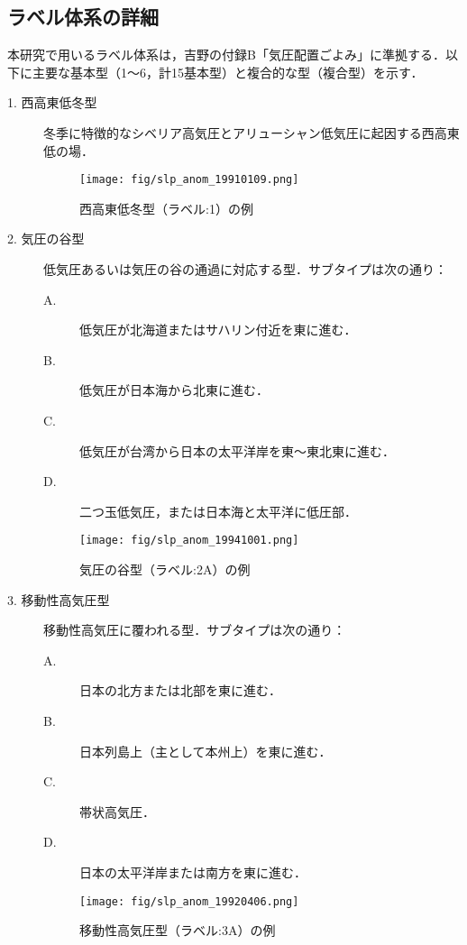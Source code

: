 \documentclass{jarticle}
\theoremstyle{definition}
\begin{document}
\subsection{ラベル体系の詳細}
本研究で用いるラベル体系は，吉野\cite{吉野2002日本の気候}の付録B「気圧配置ごよみ」に準拠する．以下に主要な基本型（1〜6，計15基本型）と複合的な型（複合型）を示す．

\begin{description}
\item[1. 西高東低冬型] 冬季に特徴的なシベリア高気圧とアリューシャン低気圧に起因する西高東低の場．

\begin{figure}[H] \centering \texttt{[image: fig/slp\_anom\_19910109.png]} \caption{西高東低冬型（ラベル:1）の例} \label{fig:slp_anom_19910109} \end{figure}

\item[2. 気圧の谷型] 低気圧あるいは気圧の谷の通過に対応する型．サブタイプは次の通り：
  \begin{description}
    \item[A.] 低気圧が北海道またはサハリン付近を東に進む．
    \item[B.] 低気圧が日本海から北東に進む．
    \item[C.] 低気圧が台湾から日本の太平洋岸を東〜東北東に進む．
    \item[D.] 二つ玉低気圧，または日本海と太平洋に低圧部．
  \end{description}

\begin{figure}[H] \centering \texttt{[image: fig/slp\_anom\_19941001.png]} \caption{気圧の谷型（ラベル:2A）の例} \label{fig:slp_anom_19941001} \end{figure}

\item[3. 移動性高気圧型] 移動性高気圧に覆われる型．サブタイプは次の通り：
  \begin{description}
    \item[A.] 日本の北方または北部を東に進む．
    \item[B.] 日本列島上（主として本州上）を東に進む．
    \item[C.] 帯状高気圧．
    \item[D.] 日本の太平洋岸または南方を東に進む．
  \end{description}

\begin{figure}[H] \centering \texttt{[image: fig/slp\_anom\_19920406.png]} \caption{移動性高気圧型（ラベル:3A）の例} \label{fig:slp_anom_19920406} \end{figure}


\end{description}
\end{document}
